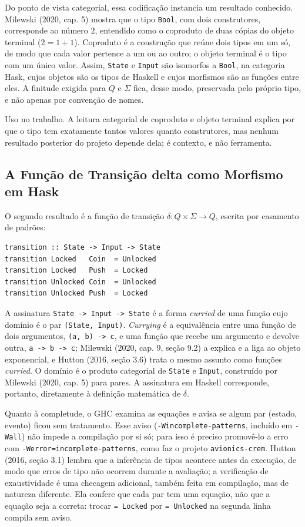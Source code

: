 \documentclass[12pt,a4paper]{article}
\begin{document}
Do ponto de vista categorial, essa codificação instancia um resultado conhecido. Milewski (2020, cap. 5) mostra que o tipo \texttt{Bool}, com dois construtores, corresponde ao número $2$, entendido como o coproduto de duas cópias do objeto terminal ($2 = 1 + 1$). Coproduto é a construção que reúne dois tipos em um só, de modo que cada valor pertence a um ou ao outro; o objeto terminal é o tipo com um único valor. Assim, \texttt{State} e \texttt{Input} são isomorfos a \texttt{Bool}, na categoria Hask, cujos objetos são os tipos de Haskell e cujos morfismos são as funções entre eles. A finitude exigida para $Q$ e $\Sigma$ fica, desse modo, preservada pelo próprio tipo, e não apenas por convenção de nomes.

Uso no trabalho. A leitura categorial de coproduto e objeto terminal explica por que o tipo tem exatamente tantos valores quanto construtores, mas nenhum resultado posterior do projeto depende dela; é contexto, e não ferramenta.

\subsection{A Função de Transição delta como Morfismo em Hask}

O segundo resultado é a função de transição $\delta: Q \times \Sigma \to Q$, escrita por casamento de padrões:

\begin{verbatim}
transition :: State -> Input -> State
transition Locked   Coin  = Unlocked
transition Locked   Push  = Locked
transition Unlocked Coin  = Unlocked
transition Unlocked Push  = Locked
\end{verbatim}

A assinatura \texttt{State -> Input -> State} é a forma \textit{curried} de uma função cujo domínio é o par \texttt{(State, Input)}. \textit{Currying} é a equivalência entre uma função de dois argumentos, \texttt{(a, b) -> c}, e uma função que recebe um argumento e devolve outra, \texttt{a -> b -> c}; Milewski (2020, cap. 9, seção 9.2) a explica e a liga ao objeto exponencial, e Hutton (2016, seção 3.6) trata o mesmo assunto como funções \textit{curried}. O domínio é o produto categorial de \texttt{State} e \texttt{Input}, construído por Milewski (2020, cap. 5) para pares. A assinatura em Haskell corresponde, portanto, diretamente à definição matemática de $\delta$.

Quanto à completude, o GHC examina as equações e avisa se algum par (estado, evento) ficou sem tratamento. Esse aviso (\texttt{-Wincomplete-patterns}, incluído em \texttt{-Wall}) não impede a compilação por si só; para isso é preciso promovê-lo a erro com \texttt{-Werror=incomplete-patterns}, como faz o projeto \texttt{avionics-crem}. Hutton (2016, seção 3.1) lembra que a inferência de tipos acontece antes da execução, de modo que erros de tipo não ocorrem durante a avaliação; a verificação de exaustividade é uma checagem adicional, também feita em compilação, mas de natureza diferente. Ela confere que cada par tem uma equação, não que a equação seja a correta: trocar \texttt{= Locked} por \texttt{= Unlocked} na segunda linha compila sem aviso.
\end{document}
